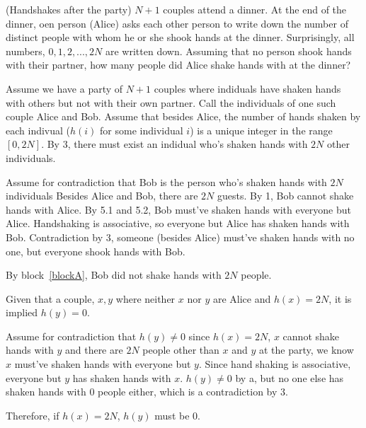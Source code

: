 \documentclass[11pt]{article}
\begin{document}
\begin{problems}

 
\problem
 
\begin{theorem}[Problem 1]
 (Handshakes after the party) $N + 1$ couples attend a dinner. At the end of the dinner, 
  oen person (Alice) asks each other person to write down the number of distinct people
  with whom he or she shook hands at the dinner. Surprisingly, all numbers, $0, 1, 2,..., 2N$
  are written down. Assuming that no person shook hands with their partner, how many people 
  did Alice shake hands with at the dinner?
\end{theorem}
\begin{longFormProof}
 \step Assume we have a party of $N + 1$ couples where indiduals have 
        shaken hands with others but not with their own partner.
 \step Call the individuals of one such couple Alice and Bob.
 \step Assume that besides Alice, the number of hands shaken by each indivual ($h(i)$ for some individual $i$)
        is a unique integer in the range $[0,2N]$.
 \step By 3, there must exist an indidual who's shaken hands with $2N$ other individuals.
 \begin{block}[blockA]
  {Assume for contradiction that Bob is the person who's shaken hands with $2N$ individuals}
    \step Besides Alice and Bob, there are $2N$ guests.
    \step By 1, Bob cannot shake hands with Alice.
    \step By 5.1 and 5.2, Bob must've shaken hands with everyone but Alice.
    \step Handshaking is associative, so everyone but Alice has shaken hands with Bob.
    \step Contradiction by 3, someone (besides Alice) must've shaken hands with no one, but everyone shook hands with Bob.
 \end{block}

 \step By block~\ref{blockA}, Bob did not shake hands with $2N$ people.

 \smallskip
 \hrulefill
 \smallskip
 
       \begin{lemma}
         Given that a couple, $x,y$ where neither $x$ nor $y$ are Alice and $h(x)=2N$, it is implied $h(y)=0$.
       \end{lemma}
 
       \begin{longFormProof}
         \begin{block}[blockB]
            {Assume for contradiction that $h(y) \neq 0$}
         \step since $h(x)=2N$, $x$ cannot shake hands with $y$ and there are $2N$ people other 
              than $x$ and $y$ at the party, we know $x$ must've shaken hands with everyone but $y$.
         \step Since hand shaking is associative, everyone but $y$ has shaken hands with $x$.
         \step $h(y) \neq 0$ by a, but no one else has shaken hands with 0 people either, 
              which is a contradiction by 3.\
         \end{block}
         \step Therefore, if $h(x)=2N$, $h(y)$ must be $0$.
       \end{longFormProof}
 

\end{longFormProof}
\end{problems}
\end{document}
